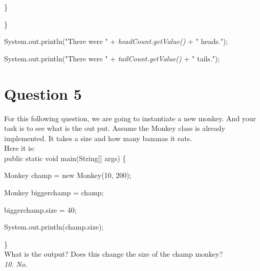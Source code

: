 \documentclass[11pt, oneside]{article}   	%
\begin{document}
\hspace{4ex} \}

\}
          
System.out.println("There were " + \textit{headCount.getValue()} + " heads.");
          
System.out.println("There were " + \textit{tailCount.getValue()} + " tails.");
          
 \section*{Question 5}
 For this following question, we are going to instantiate a new monkey. And your task is to see what is the out put. Assume the Monkey class is already implemented. It takes a size and how many bananas it eats.\\
 
  Here it is: \\
  
 public static void main(String[] args) \{ 
 
 \hspace{4ex} Monkey champ = new Monkey(10, 200);
          
 \hspace{4ex} Monkey biggerchamp = champ;
 
 \hspace{4ex} biggerchamp.size = 40; 
 
 \hspace{4ex} System.out.println(champ.size); 
 
 \} \\ \newline What is the output? Does this change the size of the champ monkey?\\
           
           	\textit{10. No.}
          
\end{document}
